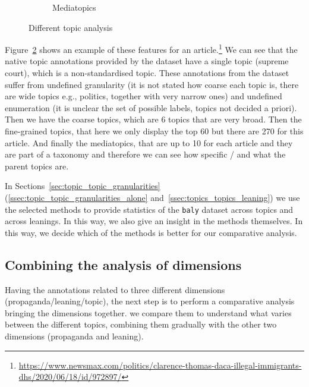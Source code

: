 \begin{figure}
\begin{subfigure}{0.8\textwidth}
		\caption{Mediatopics} %
            \label{fig:topic_analysis_different_tools_mediatopics} 
	\end{subfigure}
    \caption{Different topic analysis}
    \label{fig:topic_analysis_different_tools} 
\end{figure}

Figure~\ref{fig:topic_analysis_different_tools} shows an example of these features for an article.\footnote{\url{https://www.newsmax.com/politics/clarence-thomas-daca-illegal-immigrants-dhs/2020/06/18/id/972897/}} We can see that the native topic annotations provided by the dataset have a single topic (supreme court), which is a non-standardised topic. These annotations from the dataset suffer from undefined granularity (it is not stated how coarse each topic is, there are wide topics e.g., politics, together with very narrow ones) and undefined enumeration (it is unclear the set of possible labels, topics not decided a priori).
Then we have the coarse topics, which are 6 topics that are very broad. Then the fine-grained topics, that here we only display the top 60 but there are 270 for this article. And finally the mediatopics, that are up to 10 for each article and they are part of a taxonomy and therefore we can see how specific / and what the parent topics are.


In Sections~\ref{sec:topic_topic_granularities} (\ref{ssec:topic_topic_granularities_alone} and~\ref{ssec:topics_topics_leaning}) we use the selected methods to provide statistics of the \texttt{baly} dataset across topics and across leanings. In this way, we also give an insight in the methods themselves. In this way, we decide which of the methods is better for our comparative analysis.

\subsection{\statusorange Combining the analysis of dimensions}
\label{sec:topic_method_combining}

Having the annotations related to three different dimensions (propaganda/leaning/topic), the next step is to perform a comparative analysis bringing the dimensions together.
we compare them to understand what varies between the different topics, combining them gradually with the other two dimensions (propaganda and leaning).



